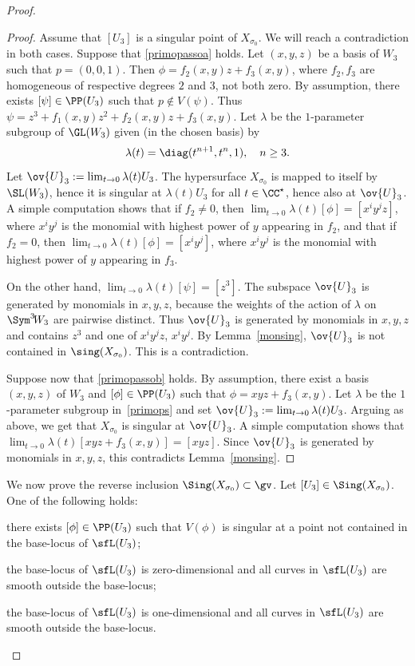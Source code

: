 \begin{proof}
\begin{proof}
Assume that $[U_3]$ is a singular point of $X_{\sigma_0}$. We will reach a contradiction in both cases.
Suppose that \eqref{primopassoa} holds. Let $(x,y,z)$ be a basis of $W_3$ such that $p=(0,0,1)$. Then
$\phi=f_2(x,y)z+f_3(x,y)$, where $f_2,f_3$ are homogeneous of respective degrees $2$ and $3$, not both zero. By assumption, there exists $[\psi]\in\PP(U_3)$ such that $p\notin V(\psi)$. Thus $\psi=z^3+f_1(x,y)z^2+f_2(x,y)z+f_3(x,y)$. Let $\lambda$ be the $1$-parameter subgroup of $\GL(W_3)$ given (in the chosen basis) by
\begin{equation}\label{primops}
\lambda(t)=\diag(t^{n+1},t^{n},1),\quad n\ge 3.
\end{equation}
Let $\ov{U}_3 :=\lim_{t\to 0}\lambda(t)U_3$. The hypersurface $X_{\sigma_0}$ is mapped to itself by $\SL(W_3)$, hence it is singular at $\lambda(t)U_3$ for all $t\in\CC^\star$,
hence also at $\ov{U}_3$. A simple computation shows that if $f_2\ne 0$, then
$\lim_{t\to 0}\lambda(t)[\phi]=[x^i y^jz]$, where $x^i y^j$ is the monomial with highest power of $y$ appearing in $f_2$, and that if $f_2=0$, then $\lim_{t\to 0}\lambda(t)[\phi]=[x^i y^j]$, where $x^i y^j$ is the monomial with highest power of $y$ appearing in $f_3$.

On the other hand, $\lim_{t\to 0}\lambda(t)[\psi]=[z^3]$. The subspace $\ov{U}_3$ is generated by monomials in $x,y,z$, because the weights of the action of $\lambda$ on $\Sym^3\! W_3$ are pairwise distinct. Thus $\ov{U}_3$ is generated by monomials in $x,y,z$ and contains $z^3$ and one of $x^i y^jz$, $x^i y^j$. By Lemma~\ref{monsing}, $\ov{U}_3$ is not contained in $\sing (X_{\sigma_0})$. This is a contradiction.

Suppose now that \eqref{primopassob} holds. By assumption, there exist a basis $(x,y,z)$ of $W_3$ and $[\phi]\in\PP(U_3)$ such that $\phi=xyz+f_3(x,y)$. Let $\lambda$ be the $1$-parameter subgroup in~\eqref{primops} and
set $\ov{U}_3 :=\lim_{t\to 0}\lambda(t)U_3$. Arguing as above, we get that $X_{\sigma_0}$ is singular at $\ov{U}_3$. A simple computation shows that $\lim_{t\to 0}\lambda(t)[xyz+f_3(x,y)]=[xyz]$. Since $\ov{U}_3$ is generated by monomials in $x,y,z$, this contradicts Lemma~\ref{monsing}.
\end{proof}

We now prove the reverse inclusion $\Sing( X_{\sigma_0})\subset \gv$.
Let $[U_3]\in \Sing( X_{\sigma_0})$. One of the following holds:
\begin{enumeratea}
\item\label{enum:a}
there exists $[\phi]\in \PP(U_3)$ such that $V(\phi)$ is singular at a point not contained in the base-locus of $\sfL(U_3)$;
\item\label{enum:b}
the base-locus of $\sfL(U_3)$ is zero-dimensional and all curves in $\sfL(U_3)$ are smooth outside the base-locus;
\item\label{enum:c}
the base-locus of $\sfL(U_3)$ is one-dimensional and all curves in $\sfL(U_3)$ are smooth outside the base-locus.
\end{enumeratea}


\end{proof}
